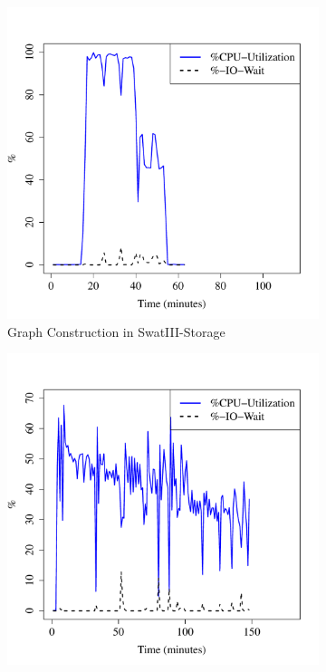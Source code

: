 \documentclass[conference]{IEEEtran}
\begin{document}
\begin{figure}[htb]
        \begin{subfigure}[b]{0.3\textwidth}
                \includegraphics[width=\textwidth]{Figure/SystemData/Plots/BGCPUSSD.pdf}
                \caption{Graph Construction in SwatIII-Storage}
                \label{fig:BGCPUSSD}
        \end{subfigure}    
        \begin{subfigure}[b]{0.3\textwidth}
                \includegraphics[width=\textwidth]{Figure/SystemData/Plots/ECCPUSSD.pdf}

\end{subfigure}
\end{figure}
\end{document}
